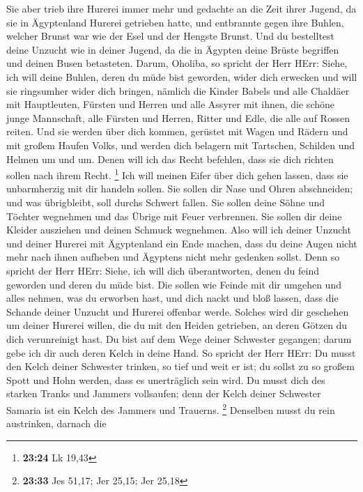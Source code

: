  Sie aber trieb ihre Hurerei immer mehr und gedachte an die
Zeit ihrer Jugend, da sie in Ägyptenland Hurerei getrieben hatte,
 und entbrannte gegen ihre Buhlen, welcher Brunst war wie
der Esel und der Hengste Brunst.  Und du bestelltest deine
Unzucht wie in deiner Jugend, da die in Ägypten deine Brüste begriffen
und deinen Busen betasteten.  Darum, Oholiba, so spricht
der Herr HErr: Siehe, ich will deine Buhlen, deren du müde bist
geworden, wider dich erwecken und will sie ringsumher wider dich
bringen,  nämlich die Kinder Babels und alle Chaldäer mit
Hauptleuten, Fürsten und Herren und alle Assyrer mit ihnen, die schöne
junge Mannschaft, alle Fürsten und Herren, Ritter und Edle, die alle auf
Rossen reiten.  Und sie werden über dich kommen, gerüstet
mit Wagen und Rädern und mit großem Haufen Volks, und werden dich
belagern mit Tartschen, Schilden und Helmen um und um. Denen will ich
das Recht befehlen, dass sie dich richten sollen nach ihrem Recht.
\footnote{\textbf{23:24} Lk 19,43}  Ich will meinen Eifer
über dich gehen lassen, dass sie unbarmherzig mit dir handeln sollen.
Sie sollen dir Nase und Ohren abschneiden; und was übrigbleibt, soll
durchs Schwert fallen. Sie sollen deine Söhne und Töchter wegnehmen und
das Übrige mit Feuer verbrennen.  Sie sollen dir deine
Kleider ausziehen und deinen Schmuck wegnehmen.  Also will
ich deiner Unzucht und deiner Hurerei mit Ägyptenland ein Ende machen,
dass du deine Augen nicht mehr nach ihnen aufheben und Ägyptens nicht
mehr gedenken sollst.  Denn so spricht der Herr HErr:
Siehe, ich will dich überantworten, denen du feind geworden und deren du
müde bist.  Die sollen wie Feinde mit dir umgehen und alles
nehmen, was du erworben hast, und dich nackt und bloß lassen, dass die
Schande deiner Unzucht und Hurerei offenbar werde.  Solches
wird dir geschehen um deiner Hurerei willen, die du mit den Heiden
getrieben, an deren Götzen du dich verunreinigt hast.  Du
bist auf dem Wege deiner Schwester gegangen; darum gebe ich dir auch
deren Kelch in deine Hand.  So spricht der Herr HErr: Du
musst den Kelch deiner Schwester trinken, so tief und weit er ist; du
sollst zu so großem Spott und Hohn werden, dass es unerträglich sein
wird.  Du musst dich des starken Tranks und Jammers
vollsaufen; denn der Kelch deiner Schwester Samaria ist ein Kelch des
Jammers und Trauerns. \footnote{\textbf{23:33} Jes 51,17; Jer 25,15; Jer
  25,18}  Denselben musst du rein austrinken, darnach die
